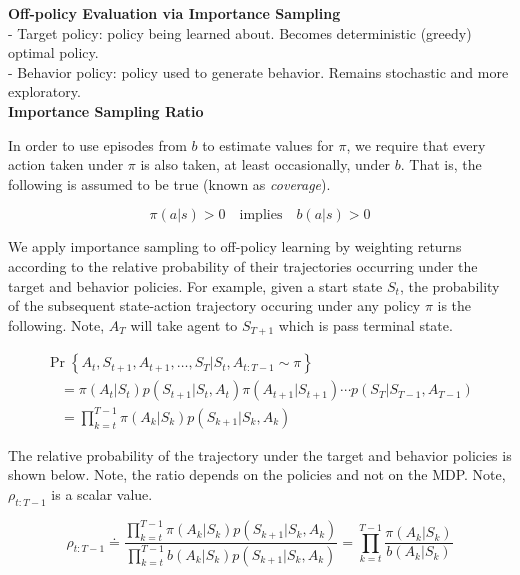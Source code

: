 \documentclass{article}
\begin{document}
\noindent
\textbf{Off-policy Evaluation via Importance Sampling}\\
- Target policy: policy being learned about. Becomes deterministic (greedy)
optimal policy.\\
- Behavior policy: policy used to generate behavior. Remains stochastic and more
exploratory.\\

\noindent
\textbf{Importance Sampling Ratio}

\noindent
In order to use episodes from $b$ to estimate values for $\pi$, we require that
every action taken under $\pi$ is also taken, at least occasionally, under $b$.
That is, the following is assumed to be true (known as \textit{coverage}).

\begin{equation}
\pi(a | s) > 0 \quad \text{implies} \quad b(a|s) > 0
\end{equation}

\noindent
We apply importance sampling to off-policy learning by weighting returns
according to the relative probability of their trajectories occurring under the
target and behavior policies. For example, given a start state $S_{t}$, the
probability of the subsequent state-action trajectory occuring under any policy
$\pi$ is the following. Note, $A_{T}$ will take agent to $S_{T+1}$ which is pass
terminal state.

\begin{equation}
\begin{array}{l}
\operatorname{Pr}\left\{A_{t}, S_{t+1}, A_{t+1}, \ldots, S_{T} | S_{t}, A_{t: T-1} \sim \pi\right\} \\
\quad=\pi\left(A_{t} | S_{t}\right) p\left(S_{t+1} | S_{t}, A_{t}\right) \pi\left(A_{t+1} | S_{t+1}\right) \cdots p\left(S_{T} | S_{T-1}, A_{T-1}\right) \\
\quad=\prod_{k=t}^{T-1} \pi\left(A_{k} | S_{k}\right) p\left(S_{k+1} | S_{k}, A_{k}\right)
\end{array}
\end{equation}

\newpage
\noindent
The relative probability of the trajectory under the target and behavior
policies is shown below. Note, the ratio depends on the policies and not on the
MDP. Note, $\rho_{t: T-1}$ is a scalar value.

\begin{equation}
\rho_{t: T-1} \doteq \frac{\prod_{k=t}^{T-1} \pi\left(A_{k} | S_{k}\right) p\left(S_{k+1} | S_{k}, A_{k}\right)}{\prod_{k=t}^{T-1} b\left(A_{k} | S_{k}\right) p\left(S_{k+1} | S_{k}, A_{k}\right)}=\prod_{k=t}^{T-1} \frac{\pi\left(A_{k} | S_{k}\right)}{b\left(A_{k} | S_{k}\right)}
\end{equation}
\end{document}
